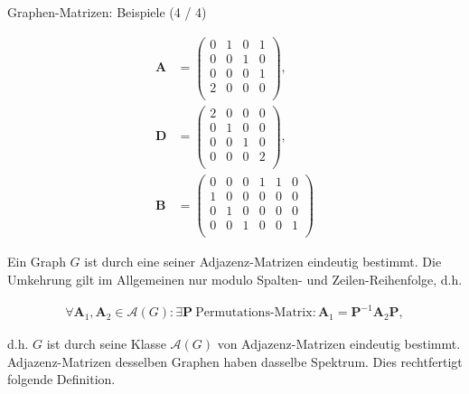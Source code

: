 \documentclass[aspectratio=169]{beamer}
\begin{document}
\begin{frame}{Graphen-Matrizen: Beispiele (4 / 4)}
\begin{multicols*}{2}
        \begin{align*}
            \mathbf A
            & =
            \begin{pmatrix}
                0 & 1 & 0 & 1 \\
                0 & 0 & 1 & 0 \\
                0 & 0 & 0 & 1 \\
                2 & 0 & 0 & 0 \\
            \end{pmatrix}, \\
            \mathbf D
            & =
            \begin{pmatrix}
                2 & 0 & 0 & 0 \\
                0 & 1 & 0 & 0 \\
                0 & 0 & 1 & 0 \\
                0 & 0 & 0 & 2 \\
            \end{pmatrix}, \\
            \mathbf B
            & =
            \begin{pmatrix}
                0 & 0 & 0 & 1 & 1 & 0 \\
                1 & 0 & 0 & 0 & 0 & 0 \\
                0 & 1 & 0 & 0 & 0 & 0 \\
                0 & 0 & 1 & 0 & 0 & 1 \\
            \end{pmatrix}
        \end{align*}

    \end{multicols*}

\end{frame}

    
\begin{frame}{}
    
    \begin{remark*}
        Ein Graph $G$ ist durch eine seiner Adjazenz-Matrizen eindeutig bestimmt.
        Die Umkehrung gilt im Allgemeinen nur modulo Spalten- und Zeilen-Reihenfolge, d.h.

        \begin{align*}
            \forall \mathbf A_1, \mathbf A_2 \in \mathcal A(G):
                \exists \mathbf P ~\text{Permutations-Matrix}:
                    \mathbf A_1 = \mathbf P^{-1} \mathbf A_2 \mathbf P,
        \end{align*}

        d.h. $G$ ist durch seine Klasse $\mathcal A(G)$ von Adjazenz-Matrizen eindeutig bestimmt.
        Adjazenz-Matrizen desselben Graphen haben dasselbe Spektrum.
        Dies rechtfertigt folgende Definition.
        
    \end{remark*}

\end{frame}
\end{document}
